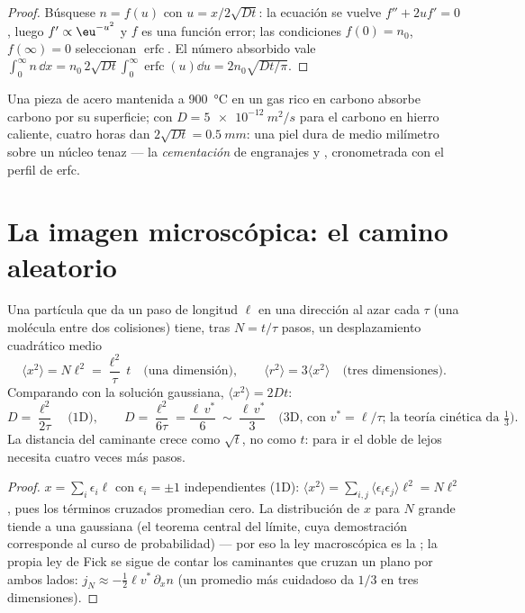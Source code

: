 \begin{proof}
Búsquese $n = f(u)$ con $u = x/2\sqrt{Dt}$: la ecuación se vuelve
$f'' + 2uf' = 0$, luego $f' \propto \eu^{-u^2}$ y $f$ es una función
error; las condiciones $f(0) = n_0$, $f(\infty) = 0$ seleccionan
$\operatorname{erfc}$. El número absorbido vale $\int_0^\infty n\,\dd x =
n_0\,2\sqrt{Dt}\int_0^\infty\operatorname{erfc}(u)\dd u = 2n_0\sqrt{Dt/\pi}$.
\end{proof}

\begin{example}\label{ex:b2:particle-diffusion:carburising}
Una pieza de acero mantenida a \qty{900}{\celsius} en un gas rico en carbono absorbe
carbono por su superficie; con $D = \qty{5e-12}{m^2/s}$ para el carbono en hierro
caliente, cuatro horas dan $2\sqrt{Dt} = \qty{0.5}{mm}$: una piel dura de medio
milímetro sobre un núcleo tenaz --- la \emph{cementación} de engranajes y
, cronometrada con el perfil de erfc.
\end{example}

\section{La imagen microscópica: el camino aleatorio}\label{sec:b2:particle-diffusion:microscopic}

\begin{proposition}\label{prop:b2:particle-diffusion:walk}
Una partícula que da un paso de longitud $\ell$ en una dirección al azar
cada $\tau$ (una molécula entre dos colisiones) tiene, tras $N =
t/\tau$ pasos, un desplazamiento cuadrático medio
\[
\langle x^2\rangle = N\ell^2 = \frac{\ell^2}{\tau}\,t
\quad\text{(una dimensión)}, \qquad
\langle r^2\rangle = 3\langle x^2\rangle \quad\text{(tres dimensiones)}.
\]
Comparando con la solución gaussiana, $\langle x^2\rangle = 2Dt$:
\[
D = \frac{\ell^2}{2\tau} \quad\text{(1D)}, \qquad
D = \frac{\ell^2}{6\tau} = \frac{\ell\,v^*}{6}\ \sim\ \frac{\ell\,v^*}{3}
\quad\text{(3D, con } v^* = \ell/\tau\text{; la teoría cinética da } \tfrac13) .
\]
La distancia del caminante crece como $\sqrt t$, no como $t$: para ir el doble de lejos
necesita cuatro veces más pasos.
\end{proposition}

\begin{proof}
$x = \sum_i \epsilon_i\ell$ con $\epsilon_i = \pm1$ independientes (1D):
$\langle x^2\rangle = \sum_{i,j}\langle\epsilon_i\epsilon_j\rangle\ell^2 =
N\ell^2$, pues los términos cruzados promedian cero. La distribución de $x$
para $N$ grande tiende a una gaussiana (el teorema central del límite, cuya
demostración corresponde al curso de probabilidad) --- por eso la
ley macroscópica es la ; la propia ley de Fick se sigue
de contar los caminantes que cruzan un plano por ambos lados: $j_N \approx
-\tfrac12\ell v^*\,\partial_x n$ (un promedio más cuidadoso da $1/3$ en
tres dimensiones).
\end{proof}

